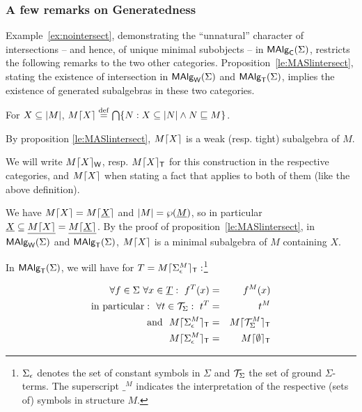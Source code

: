 \documentclass[10pt]{article}
\begin{document}

\subsubsection{A few remarks on Generatedness}

Example~\ref{ex:nointersect}, demonstrating the ``unnatural'' character of
intersections -- and hence, of unique minimal subobjects -- in
$\mbox{\rm\sf MAlg}_{\sf C}(\Sigma)$, restricts the following remarks to the two other
categories.  Proposition~\ref{le:MASlintersect}, stating the existence
of intersection in $\mbox{\rm\sf MAlg}_{\sf W}(\Sigma)$ and $\mbox{\rm\sf MAlg}_{\sf T}(\Sigma)$, implies the existence of
generated subalgebras in these two categories.

\begin{Definition}
\label{de:gen}
For $X\subseteq|M|$, $M\lceil X \rceil \stackrel{{\rm \tiny{def}}}= \bigcap \{N:X\subseteq|N|\land N\mathrel{\sqsubseteq} M\}$.
\end{Definition}

\noindent
By proposition \ref{le:MASlintersect}, $M\lceil X \rceil$ is a weak
(resp. tight) subalgebra of $M$.

We will write $M\lceil X \rceil_{\sf W}$, resp. $M\lceil X \rceil_{\sf T}$ for this construction
in the respective categories, and $M\lceil X \rceil$ when stating a fact that
applies to both of them (like the above definition).

We have $M\lceil X \rceil=M\lceil \underline {X} \rceil$ and $|M|=\wp(\underline {M})$,
so in particular $\underline {X}\subseteq\underline {M\lceil X \rceil}=\underline {M\lceil \underline {X} \rceil}$.  By the proof of
proposition~\ref{le:MASlintersect}, in $\mbox{\rm\sf MAlg}_{\sf W}(\Sigma)$ and $\mbox{\rm\sf MAlg}_{\sf T}(\Sigma)$, $M\lceil X \rceil$ is a minimal subalgebra of $M$ containing $X$.


In $\mbox{\rm\sf MAlg}_{\sf T}(\Sigma)$, we will have for $T=M\lceil \Sigma_{\epsilon}^M \rceil_{\sf T}:$\footnote{$\Sigma_{\epsilon}$ denotes
the set of constant symbols in $\Sigma$ and ${\cal T}_{\Sigma}$ the set of ground $\Sigma$-terms.
The superscript $\_^M$ indicates the interpretation of the respective (sets of) symbols
in structure $M$.}

\begin{eqnarray}
\forall f\in\Sigma\ \forall x\in\underline {T}:\ f^T(x) 
& = & f^M(x) \label{eq:Tb} \\ 
{\rm in\ particular:\ \ }\forall t\in{\cal T}_{\Sigma}:\ t^T 
& = & t^M \nonumber \\ 
{\rm and\ \ }M\lceil \Sigma_{\epsilon}^M \rceil_{\sf T} 
& = & M\lceil {\cal T}_{\Sigma}^M \rceil_{\sf T} \label{eq:Ta} \\
M\lceil \Sigma_{\epsilon}^M \rceil_{\sf T} 
& = & M\lceil \emptyset \rceil_{\sf T} \label{eq:Tc}
\end{eqnarray}
\end{document}
